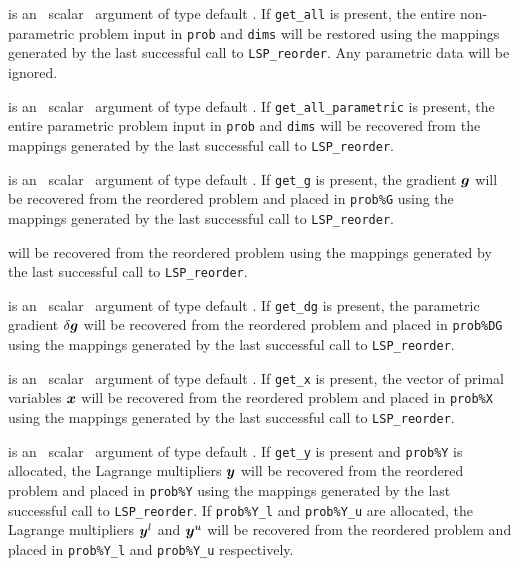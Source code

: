 \documentclass{galahad}
\newcommand{\packagename}{LSP}
\begin{document}
\begin{description}
is an \optional\ scalar \intentin\ argument of type default \logical. 
If {\tt get\_all} is present, the entire non-parametric problem 
input in {\tt prob} and {\tt dims} will be restored using the 
mappings generated by the last successful call to {\tt \packagename\_reorder}. 
Any parametric data will be ignored.

is an \optional\ scalar \intentin\ argument of type default \logical. 
If {\tt get\_all\_parametric} is present, the entire parametric problem 
input in {\tt prob} and {\tt dims} will be recovered from the 
mappings generated by the last successful call to {\tt \packagename\_reorder}. 
 
is an \optional\ scalar \intentin\ argument of type default \logical. 
If {\tt get\_g} is present, the gradient ${\bm{g}}$
will be recovered from  the reordered problem and placed in {\tt prob\%G} 
using the mappings generated by the last successful call to 
{\tt \packagename\_reorder}. 

will be recovered from  the reordered problem using the 
mappings generated by the last successful call to {\tt \packagename\_reorder}. 
 
is an \optional\ scalar \intentin\ argument of type default \logical. 
If {\tt get\_dg} is present, the parametric gradient $\delta {\bm{g}}$
will be recovered from  the reordered problem and placed in {\tt prob\%DG} 
using the mappings generated by the last successful call to 
{\tt \packagename\_reorder}. 
 
is an \optional\ scalar \intentin\ argument of type default \logical. 
If {\tt get\_x} is present, the vector of primal variables ${\bm{x}}$
will be recovered from  the reordered problem and placed in {\tt prob\%X} 
using the mappings generated by the last successful call to 
{\tt \packagename\_reorder}. 
 
is an \optional\ scalar \intentin\ argument of type default \logical. 
If {\tt get\_y} is present and {\tt prob\%Y} is allocated, 
the Lagrange multipliers 
${\bm{y}}$ will be recovered from  the reordered problem and placed in {\tt prob\%Y} 
using the mappings generated by the last successful call to 
{\tt \packagename\_reorder}. If {\tt prob\%Y\_l} and {\tt prob\%Y\_u} 
are allocated, the Lagrange multipliers 
${\bm{y}}^l$ and ${\bm{y}}^u$ will be recovered from  the reordered problem and 
placed in {\tt prob\%Y\_l} and {\tt prob\%Y\_u} respectively.
 

\end{description}
\end{document}
